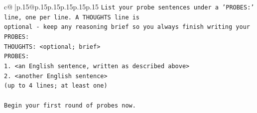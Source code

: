 \documentclass{article}
\begin{document}
{\begin{supertabular}{c@{$\;$}|p{.15\linewidth}@{}p{.15\linewidth}p{.15\linewidth}p{.15\linewidth}p{.15\linewidth}p{.15\linewidth}}
{{{\texttt{List your probe sentences under a 'PROBES:' line, one per line. A THOUGHTS line is} \\
\texttt{optional {-} keep any reasoning brief so you always finish writing your PROBES:} \\
\texttt{THOUGHTS: <optional; brief>} \\
\texttt{PROBES:} \\
\texttt{1. <an English sentence, written as described above>} \\
\texttt{2. <another English sentence>} \\
\texttt{(up to 4 lines; at least one)} \\
\\ 
\texttt{Begin your first round of probes now.} \\
            }
        }
    }
     \\ \\


\end{supertabular}}
\end{document}
